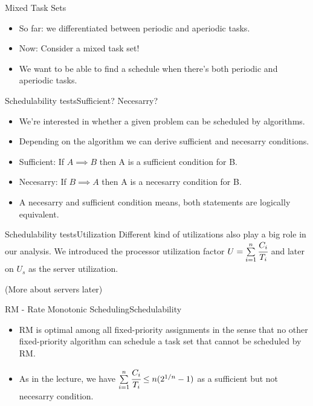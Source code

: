\begin{frame}{Mixed Task Sets}{}
    \begin{itemize}
        \item So far: we differentiated between \alert{periodic} and \alert{aperiodic} tasks.
        \item Now: Consider a \alert{mixed} task set!
        \item We want to be able to find a schedule when there's both \alert{periodic} and \alert{aperiodic} tasks.
    \end{itemize}
\end{frame}

\begin{frame}{Schedulability tests}{Sufficient? Necesarry?}
    \begin{itemize}
        \item We're interested in whether a given problem can be scheduled by algorithms.
        \item Depending on the algorithm we can derive sufficient and necesarry conditions.
        \item[]\alert{Sufficient:} If $A \implies B$ then A is a sufficient condition for B.
        \item[]\alert{Necesarry:} If $B \implies A$ then A is a necesarry condition for B.
        \item A necesarry and sufficient condition means, both statements are logically equivalent.
    \end{itemize}
\end{frame}
\begin{frame}{Schedulability tests}{Utilization}
    Different kind of utilizations also play a big role in our analysis. We introduced the \alert{processor utilization factor} $U = \sum\limits_{i=1}^{n}\cfrac{C_i}{T_i}$ and later on $U_s$ as the server utilization.

    (More about servers later)
\end{frame}
\begin{frame}{RM - Rate Monotonic Scheduling}{Schedulability}
\begin{itemize}
    \item RM is optimal among all fixed-priority assignments in the sense that no other fixed-priority algorithm can schedule a task set that cannot be scheduled by RM.
    \item As in the lecture, we have $\sum\limits_{i=1}^{n}\cfrac{C_i}{T_i} \leq n(2^{1/n}-1)$ as a \alert{sufficient} but not \alert{necesarry} condition.
\end{itemize}
\end{frame}
